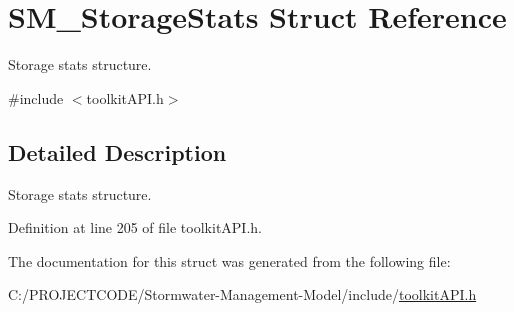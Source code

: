 \hypertarget{struct_s_m___storage_stats}{}\section{S\+M\+\_\+\+Storage\+Stats Struct Reference}
\label{struct_s_m___storage_stats}


Storage stats structure.  




{\ttfamily \#include $<$toolkit\+A\+P\+I.\+h$>$}



\subsection{Detailed Description}
Storage stats structure. 

Definition at line 205 of file toolkit\+A\+P\+I.\+h.



The documentation for this struct was generated from the following file\+:\begin{DoxyCompactItemize}
\item 
C\+:/\+P\+R\+O\+J\+E\+C\+T\+C\+O\+D\+E/\+Stormwater-\/\+Management-\/\+Model/include/\hyperlink{toolkit_a_p_i_8h}{toolkit\+A\+P\+I.\+h}\end{DoxyCompactItemize}
